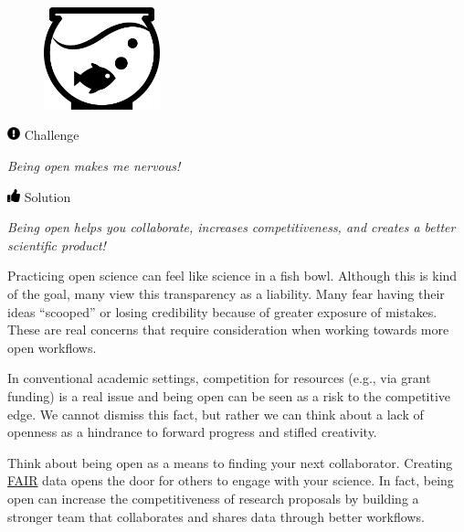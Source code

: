 \documentclass[
  letterpaper,
  DIV=11,
  numbers=noendperiod]{scrreprt}
\begin{document}
\begin{figure}

{\centering \includegraphics[width=0.3\textwidth,height=\textheight]{./img/fishbowl.png}

}

\end{figure}

\includegraphics[width=1em,height=1em]{./implement_files/figure-pdf/fa-icon-e38cc40f3c6469ef5f44a7764a5c5910.pdf}
Challenge

\emph{Being open makes me nervous!}

\includegraphics[width=1em,height=1em]{./implement_files/figure-pdf/fa-icon-e4ee65476be467d7be8a1ae9cb02ffda.pdf}
Solution

\emph{Being open helps you collaborate, increases competitiveness, and
creates a better scientific product!}

Practicing open science can feel like science in a fish bowl. Although
this is kind of the goal, many view this transparency as a liability.
Many fear having their ideas ``scooped'' or losing credibility because
of greater exposure of mistakes. These are real concerns that require
consideration when working towards more open workflows.

In conventional academic settings, competition for resources (e.g., via
grant funding) is a real issue and being open can be seen as a risk to
the competitive edge. We cannot dismiss this fact, but rather we can
think about a lack of openness as a hindrance to forward progress and
stifled creativity.

Think about being open as a means to finding your next collaborator.
Creating \protect\hyperlink{fair}{FAIR} data opens the door for others
to engage with your science. In fact, being open can increase the
competitiveness of research proposals by building a stronger team that
collaborates and shares data through better workflows.
\end{document}

